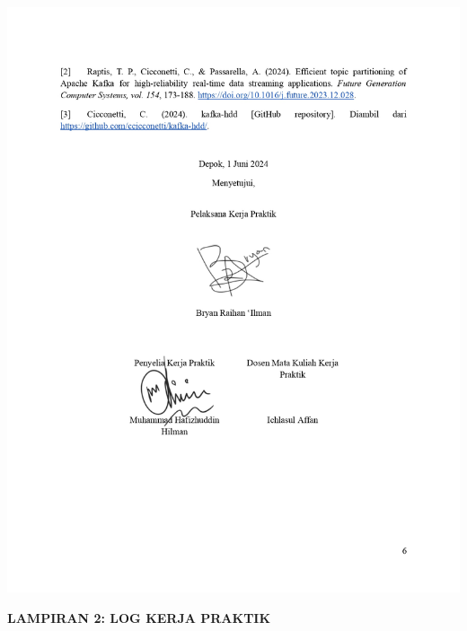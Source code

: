 \includegraphics[width=1\textwidth]{assets/pics/KAKP_Bryan Raihan Ilman_2106704351_signed_page-0006.jpg}

\newpage

\begin{center}
    \textbf{\large LAMPIRAN 2: LOG KERJA PRAKTIK}
\end{center}
\label{appendix:lampiran-2}

